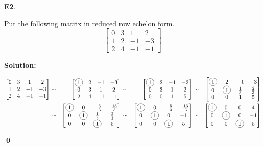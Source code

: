 \documentclass{article}
\newenvironment{problem}[1]
{
	\begin{flushleft}
	\textbf{#1}.
	\ignorespaces
}
{
	\end{flushleft}
}
\newenvironment{solution}
{
	\ignorespaces
	\textbf{Solution:}
}
{
	\ignorespacesafterend
	\begin{flushright}
	{\bfseries \qed}
	\end{flushright}
}
\begin{document}
\begin{problem}{E2}
Put the following matrix in reduced row echelon form.
\[
	\begin{bmatrix}
	0 & 3 & 1 & 2 \\
	1 & 2 & -1 & -3 \\
	2 & 4 & -1 & -1
	\end{bmatrix}
\]
\end{problem}
\begin{solution}
\begin{alignat*}{4}
	\begin{bmatrix}
	0 & 3 & 1 & 2 \\
	1 & 2 & -1 & -3 \\
	2 & 4 & -1 & -1
	\end{bmatrix}
	&\sim&
	\begin{bmatrix}
	\circledNumber{1} & 2 & -1 & -3 \\
	0 & 3 & 1 & 2 \\
	2 & 4 & -1 & -1
	\end{bmatrix}
	&\sim&
	\begin{bmatrix}
	\circledNumber{1} & 2 & -1 & -3 \\
	0 & 3 & 1 & 2 \\
	0 & 0 & 1 & 5
	\end{bmatrix}
	&\sim&
	\begin{bmatrix}
	\circledNumber{1} & 2 & -1 & -3 \\
	0 & \circledNumber{1} & \frac{1}{3} & \frac{2}{3} \\
	0 & 0 & 1 & 5
	\end{bmatrix} \\
	&\sim&
	\begin{bmatrix}
	\circledNumber{1} & 0 & -\frac{5}{3} & -\frac{13}{3} \\
	0 & \circledNumber{1} & \frac{1}{3} & \frac{2}{3} \\
	0 & 0 & \circledNumber{1} & 5
	\end{bmatrix}
	&\sim&
	\begin{bmatrix}
	\circledNumber{1} & 0 & -\frac{5}{3} & -\frac{13}{3} \\
	0 & \circledNumber{1} & 0 & -1 \\
	0 & 0 & \circledNumber{1} & 5
	\end{bmatrix}
	&\sim&
	\begin{bmatrix}
	\circledNumber{1} & 0 & 0 & 4 \\
	0 & \circledNumber{1} & 0 & -1 \\
	0 & 0 & \circledNumber{1} & 5
	\end{bmatrix}
\end{alignat*}
\end{solution}
\end{document}
